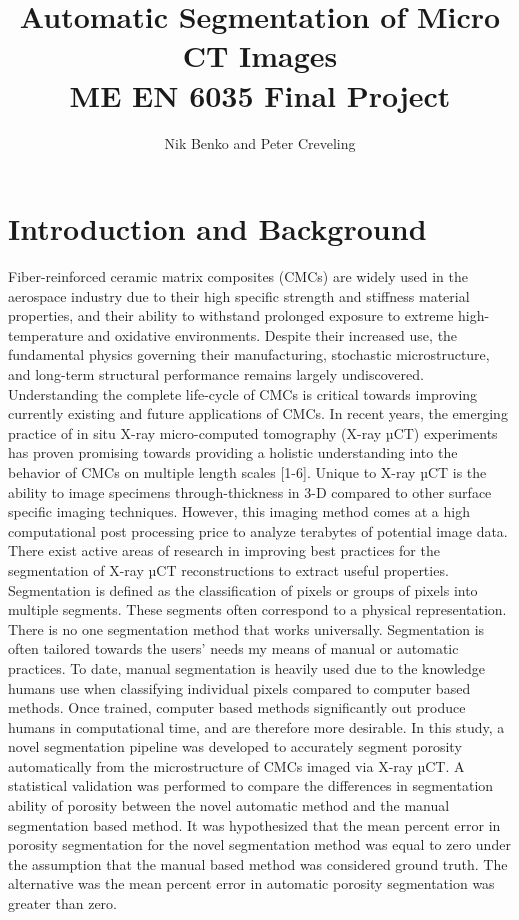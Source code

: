 \documentclass[12pt]{article}
\begin{document}
\title{ Automatic Segmentation of Micro CT Images  \\ \normalsize{ME EN 6035 Final Project}}
\author{Nik Benko and Peter Creveling}
\maketitle


\begin{abstract} 

\end{abstract}

\section{Introduction and Background}

Fiber-reinforced ceramic matrix composites (CMCs) are widely used in the aerospace industry due to their high specific strength and stiffness material properties, and their ability to withstand prolonged exposure to extreme high-temperature and oxidative environments. Despite their increased use, the fundamental physics governing their manufacturing, stochastic microstructure, and long-term structural performance remains largely undiscovered. Understanding the complete life-cycle of CMCs is critical towards improving currently existing and future applications of CMCs. In recent years, the emerging practice of in situ X-ray micro-computed tomography (X-ray µCT) experiments has proven promising towards providing a holistic understanding into the behavior of CMCs on multiple length scales [1-6].
Unique to X-ray µCT is the ability to image specimens through-thickness in 3-D compared to other surface specific imaging techniques. However, this imaging method comes at a high computational post processing price to analyze terabytes of potential image data. There exist active areas of research in improving best practices for the segmentation of X-ray µCT reconstructions to extract useful properties. Segmentation is defined as the classification of pixels or groups of pixels into multiple segments. These segments often correspond to a physical representation. There is no one segmentation method that works universally. Segmentation is often tailored towards the users’ needs my means of manual or automatic practices. To date, manual segmentation is heavily used due to the knowledge humans use when classifying individual pixels compared to computer based methods. Once trained, computer based methods significantly out produce humans in computational time, and are therefore more desirable.
In this study, a novel segmentation pipeline was developed to accurately segment porosity automatically from the microstructure of CMCs imaged via X-ray µCT. A statistical validation was performed to compare the differences in segmentation ability of porosity between the novel automatic method and the manual segmentation based method. It was hypothesized that the mean percent error in porosity segmentation for the novel segmentation method was equal to zero under the assumption that the manual based method was considered ground truth. The alternative was the mean percent error in automatic porosity segmentation was greater than zero.
\end{document}
